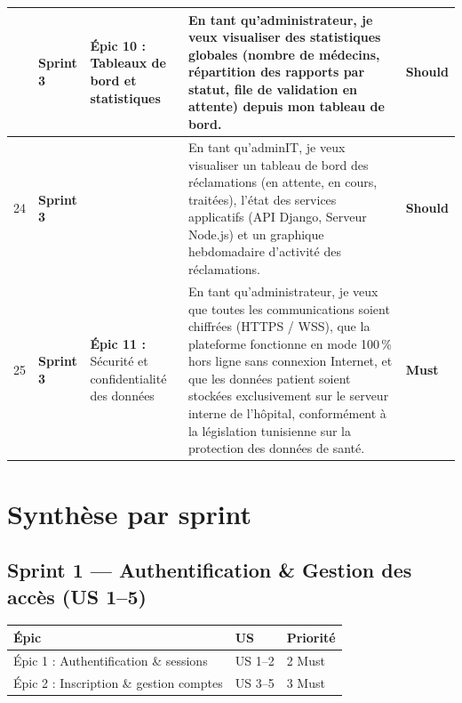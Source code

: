 \documentclass[12pt,a4paper]{article}
\newcommand{\must}{\textcolor{must}{\textbf{Must}}}
\newcommand{\should}{\textcolor{should}{\textbf{Should}}}
\newcommand{\sprintthree}[1]{\cellcolor{sprint3bg}\textcolor{sprint3txt}{\textbf{#1}}}
\begin{document}
\begin{longtable}{
  |>{\centering\arraybackslash}p{0.7cm}
  |>{\centering\arraybackslash}p{2.2cm}
  |p{3.8cm}
  |p{6.8cm}
  |>{\centering\arraybackslash}p{1.4cm}|
}
23 & \sprintthree{Sprint 3}
   & \multirow{2}{3.8cm}{\textbf{Épic 10 :} Tableaux de bord et statistiques}
   & En tant qu'administrateur, je veux visualiser des statistiques globales (nombre de médecins, répartition des rapports par statut, file de validation en attente) depuis mon tableau de bord.
   & \should \\ \cline{1-2}\cline{4-5}

24 & \sprintthree{Sprint 3} &
   & En tant qu'adminIT, je veux visualiser un tableau de bord des réclamations (en attente, en cours, traitées), l'état des services applicatifs (API Django, Serveur Node.js) et un graphique hebdomadaire d'activité des réclamations.
   & \should \\ \hline

25 & \sprintthree{Sprint 3}
   & \textbf{Épic 11 :} Sécurité et confidentialité des données
   & En tant qu'administrateur, je veux que toutes les communications soient chiffrées (HTTPS / WSS), que la plateforme fonctionne en mode 100\,\% hors ligne sans connexion Internet, et que les données patient soient stockées exclusivement sur le serveur interne de l'hôpital, conformément à la législation tunisienne sur la protection des données de santé.
   & \must \\ \hline

\end{longtable}

\newpage
\section{Synthèse par sprint}

\subsection*{Sprint 1 — Authentification \& Gestion des accès (US 1–5)}
\begin{tabular}{|l|l|l|}
\hline
\rowcolor{sprint1bg}
\textcolor{sprint1txt}{\textbf{Épic}} & \textcolor{sprint1txt}{\textbf{US}} & \textcolor{sprint1txt}{\textbf{Priorité}} \\ \hline
Épic 1 : Authentification \& sessions    & US 1–2  & 2 Must \\ \hline
Épic 2 : Inscription \& gestion comptes  & US 3–5  & 3 Must \\ \hline
\end{tabular}

\vspace{0.5cm}
\end{document}
